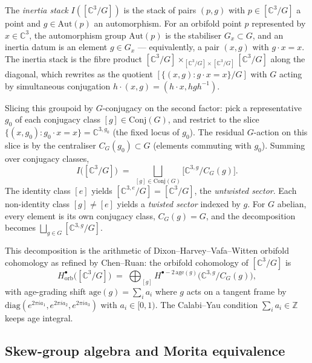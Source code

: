 The \emph{inertia stack} $I([\mathbb{C}^3/G])$ is the stack of pairs $(p, g)$ with $p \in [\mathbb{C}^3/G]$ a point and $g \in \mathrm{Aut}(p)$ an automorphism. For an orbifold point $p$ represented by $x \in \mathbb{C}^3$, the automorphism group $\mathrm{Aut}(p)$ is the stabiliser $G_x \subset G$, and an inertia datum is an element $g \in G_x$ --- equivalently, a pair $(x, g)$ with $g \cdot x = x$. The inertia stack is the fibre product $[\mathbb{C}^3/G] \times_{[\mathbb{C}^3/G] \times [\mathbb{C}^3/G]} [\mathbb{C}^3/G]$ along the diagonal, which rewrites as the quotient $[\{(x, g) : g \cdot x = x\} / G]$ with $G$ acting by simultaneous conjugation $h \cdot (x, g) = (h \cdot x, h g h^{-1})$.

Slicing this groupoid by $G$-conjugacy on the second factor: pick a representative $g_0$ of each conjugacy class $[g] \in \mathrm{Conj}(G)$, and restrict to the slice $\{(x, g_0) : g_0 \cdot x = x\} = \mathbb{C}^{3, g_0}$ (the fixed locus of $g_0$). The residual $G$-action on this slice is by the centraliser $C_G(g_0) \subset G$ (elements commuting with $g_0$). Summing over conjugacy classes,
\[
I\bigl([\mathbb{C}^3/G]\bigr) \;=\; \bigsqcup_{[g] \in \mathrm{Conj}(G)} \bigl[\mathbb{C}^{3, g}/C_G(g)\bigr].
\]
The identity class $[e]$ yields $[\mathbb{C}^{3, e}/G] = [\mathbb{C}^3/G]$, the \emph{untwisted sector}. Each non-identity class $[g] \neq [e]$ yields a \emph{twisted sector} indexed by $g$. For $G$ abelian, every element is its own conjugacy class, $C_G(g) = G$, and the decomposition becomes $\bigsqcup_{g \in G} [\mathbb{C}^{3, g}/G]$.

This decomposition is the arithmetic of Dixon--Harvey--Vafa--Witten orbifold cohomology as refined by Chen--Ruan: the orbifold cohomology of $[\mathbb{C}^3/G]$ is
\[
H^\bullet_{\mathrm{orb}}\bigl([\mathbb{C}^3/G]\bigr) \;=\; \bigoplus_{[g]} H^{\bullet - 2\,\mathrm{age}(g)}\bigl(\mathbb{C}^{3,g}/C_G(g)\bigr),
\]
with age-grading shift $\mathrm{age}(g) = \sum_i a_i$ where $g$ acts on a tangent frame by $\mathrm{diag}(e^{2\pi i a_1}, e^{2\pi i a_2}, e^{2\pi i a_3})$ with $a_i \in [0, 1)$. The Calabi--Yau condition $\sum_i a_i \in \mathbb{Z}$ keeps age integral.

\subsection{Skew-group algebra and Morita equivalence}
\label{subsec:skew-group-morita}


